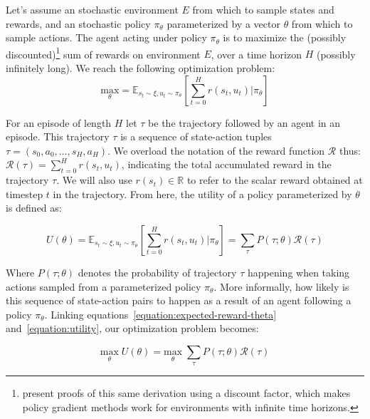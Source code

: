 \documentclass{../main.tex}{}
\begin{document}
Let's assume an stochastic environment $E$ from which to sample states and rewards, and an stochastic policy $\pi_{\theta}$ parameterized by a vector $\theta$ from which to sample actions. The agent acting under policy $\pi_{\theta}$ is to maximize the (possibly discounted)\footnote{\cite{Williams1992, Sutton1999} present proofs of this same derivation using a discount factor, which makes policy gradient methods work for environments with infinite time horizons.} sum of rewards on environment $E$, over a time horizon $H$ (possibly infinitely long). We reach the following optimization problem:
\begin{equation}\label{equation:expected-reward-theta}
\underset{\theta}{\text{max}} = \mathbb{E}_{s_{t} \sim \xi, u_t \sim \pi_{\theta}}[\sum^{H}_{t=0} r(s_t, u_t) | \pi_{\theta}]
\end{equation}

For an episode of length $H$ let $\tau$ be the trajectory followed by an agent in an episode. This trajectory $\tau$ is a sequence of state-action tuples $\tau = (s_0, a_0, \dots, s_H, a_H)$. We overload the notation of the reward function $\mathcal{R}$ thus: $\mathcal{R}(\tau) = \sum_{t=0}^{H}r(s_t, u_t)$, indicating the total accumulated reward in the trajectory $\tau$. We will also use $r(s_t) \in \mathbb{R}$ to refer to the scalar reward obtained at timestep $t$ in the trajectory. From here, the utility of a policy parameterized by $\theta$ is defined as:

\begin{equation}\label{equation:utility}
U(\theta) = \mathbb{E}_{s_t \sim \xi, u_t \sim \pi_{\theta}}[\sum_{t=0}^{H}r(s_t, u_t) | \pi_{\theta}] = \sum_{\tau}P(\tau ; \theta)\mathcal{R}(\tau)
\end{equation}

Where $P(\tau ; \theta)$ denotes the probability of trajectory $\tau$ happening when taking actions sampled from a parameterized policy $\pi_{\theta}$. More informally, how likely is this sequence of state-action pairs to happen as a result of an agent following a policy $\pi_{\theta}$. Linking equations~\ref{equation:expected-reward-theta} and~\ref{equation:utility}, our optimization problem becomes:

\begin{equation}\label{equation:utility-optimization}
\underset{\theta}{\text{max}}\; U(\theta) = \underset{\theta}{\text{max}}\; \sum_{\tau}P(\tau ; \theta)\mathcal{R}(\tau)
\end{equation}
\end{document}
